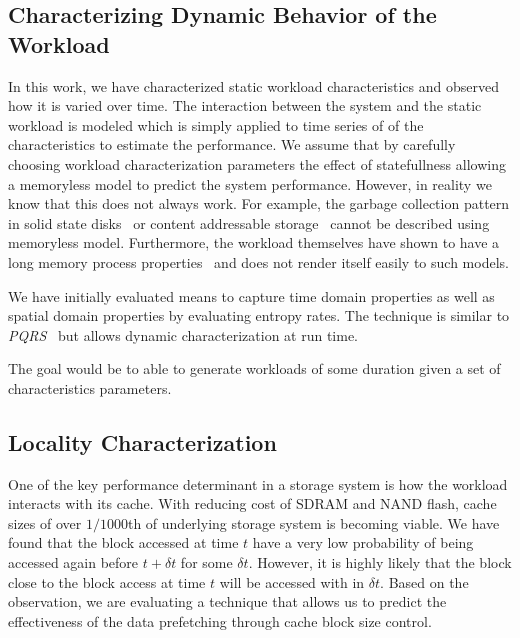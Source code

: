 \subsection{Characterizing Dynamic Behavior of the Workload}
In this work, we have characterized static workload characteristics and observed how it is varied over time. 
The interaction between the system and the static workload is modeled which is simply applied to time series of of the characteristics to estimate the performance. 
We assume that by carefully choosing workload characterization parameters the effect of statefullness allowing a memoryless model to predict the system performance. 
However, in reality we know that this does not always work. 
For example, the garbage collection pattern in solid state disks~\cite{agrawal:2008} or content addressable storage~\cite{ungureanu:2010} cannot be described using memoryless model. 
Furthermore, the workload themselves have shown to have a long memory process properties~\cite{gomez:2000} and does not render itself easily to such models.

We have initially evaluated means to capture time domain properties as well as spatial domain properties by evaluating entropy rates.
The technique is similar to \emph{PQRS}~\cite{wang:2004} but allows dynamic characterization at run time. 

The goal would be to able to generate workloads of some duration given a set of characteristics parameters.

\subsection{Locality Characterization}
One of the key performance determinant in a storage system is how the workload interacts with its cache.
With reducing cost of SDRAM and NAND flash, cache sizes of over $1/1000$th of underlying storage system is becoming viable. 
We have found that the block accessed at time $t$ have a very low probability of being accessed again before $t+\delta t$ for some $\delta t$. 
However, it is highly likely that the block close to the block access at time $t$ will be accessed with in $\delta t$. 
Based on the observation, we are evaluating a technique that allows us to predict the effectiveness of the data prefetching through cache block size control. 


